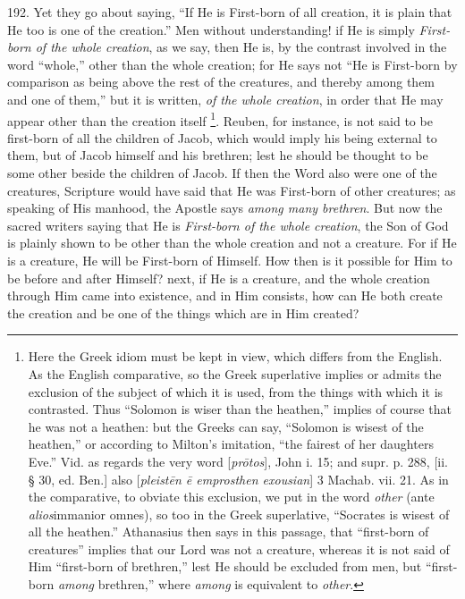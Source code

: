 192. Yet they go about saying,
``If He is First-born of all creation, it is plain that He too is one
of the creation.'' Men without understanding! if He is simply \emph{First-born
of the whole creation}, as we say, then He is, by the contrast
involved in the word ``whole,'' other than the whole creation; for He
says not ``He is First-born by comparison as being above the rest of
the creatures, and thereby among them and one of them,'' but it is
written, \emph{of the whole creation}, in order that He may appear
other than the creation itself \footnote{Here the Greek idiom must be kept in view, which differs from the
English. As the English comparative, so the Greek superlative implies
or admits the exclusion of the subject of which it is used, from the
things with which it is contrasted. Thus ``Solomon is wiser than the
heathen,'' implies of course that he was not a heathen: but the Greeks
can say, ``Solomon is wisest of the heathen,'' or according to Milton's
imitation, ``the fairest of her daughters Eve.'' Vid. as regards the
very word [\emph{pr\={o}tos}], John i. 15; and supr. p. 288, [ii.
§ 30, ed. Ben.] also [\emph{pleist\={e}n \={e} emprosthen exousian}]
3 Machab. vii. 21. As in the comparative, to obviate this exclusion,
we put in the word \emph{other} (ante \emph{alios}immanior omnes), so
too in the Greek superlative, ``Socrates is wisest of all the heathen.''
Athanasius then says in this passage, that ``first-born of creatures''
implies that our Lord was not a creature, whereas it is not said of
Him ``first-born of brethren,'' lest He should be excluded from men, but
``first-born \emph{among} brethren,'' where \emph{among} is equivalent
to \emph{other}.}.
Reuben, for instance, is not said to be first-born of all the children
of Jacob, which would imply his being external to them, but of Jacob
himself and his brethren; lest he should be thought to be some other
beside the children of Jacob. If then the Word also were one of the
creatures, Scripture would have said that He was First-born of other
creatures; as speaking of His manhood, the Apostle says \emph{among
many brethren}. But now the sacred writers saying that He is \emph{First-born
of the whole creation}, the Son of God is plainly shown to be other
than the whole creation and not a creature. For if He is a creature,
He will be First-born of Himself. How then is it possible for Him to
be before and after Himself? next, if He is a creature, and the whole
creation through Him came into existence, and in Him consists, how can
He both create the creation and be one of the things which are in Him
created?

